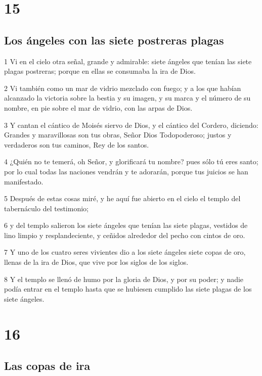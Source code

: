 \chapter{15}

\section*{Los ángeles con las siete postreras plagas}

\par 1 Vi en el cielo otra señal, grande y admirable: siete ángeles que tenían las siete plagas postreras; porque en ellas se consumaba la ira de Dios.
\par 2 Vi también como un mar de vidrio mezclado con fuego; y a los que habían alcanzado la victoria sobre la bestia y su imagen, y su marca y el número de su nombre, en pie sobre el mar de vidrio, con las arpas de Dios.
\par 3 Y cantan el cántico de Moisés siervo de Dios, y el cántico del Cordero, diciendo: Grandes y maravillosas son tus obras, Señor Dios Todopoderoso; justos y verdaderos son tus caminos, Rey de los santos.
\par 4 ¿Quién no te temerá, oh Señor, y glorificará tu nombre? pues sólo tú eres santo; por lo cual todas las naciones vendrán y te adorarán, porque tus juicios se han manifestado.
\par 5 Después de estas cosas miré, y he aquí fue abierto en el cielo el templo del tabernáculo del testimonio;
\par 6 y del templo salieron los siete ángeles que tenían las siete plagas, vestidos de lino limpio y resplandeciente, y ceñidos alrededor del pecho con cintos de oro.
\par 7 Y uno de los cuatro seres vivientes dio a los siete ángeles siete copas de oro, llenas de la ira de Dios, que vive por los siglos de los siglos.
\par 8 Y el templo se llenó de humo por la gloria de Dios, y por su poder; y nadie podía entrar en el templo hasta que se hubiesen cumplido las siete plagas de los siete ángeles.

\chapter{16}

\section*{Las copas de ira}

